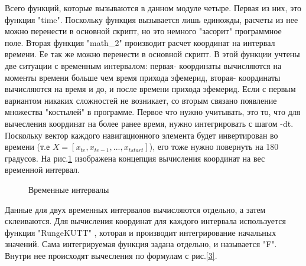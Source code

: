 \documentclass[]{article}
\begin{document}
	Всего функций, которые вызываются в данном модуле четыре.
	Первая из них, это функция "time". Поскольку функция вызывается лишь единожды, расчеты из нее можно перенести в основной скрипт, но это немного "засорит" программное поле.
	Вторая функция "math\_2" производит расчет координат на интервал времени. Ее так же можно перенести в основной скрипт. В этой функции учтены две ситуации с временным интервалом:
	первая- координаты вычисляются на моменты времени больше чем время прихода эфемерид, вторая- координаты вычисляются на время и до, и после времени прихода эфемерид. Если с первым вариантом никаких сложностей не возникает, со вторым связано появление множества "костылей" в программе. Первое что нужно учитывать, это то, что для вычесления координат на более ранее время, нужно интегрировать с шагом -dt. Поскольку вектор каждого навигационного элемента будет инвертирован во времени (т.е $ X=[x_{te}, x_{te-1},...,x_{tstart}]$), его тоже нужно повернуть на 180 градусов. 
	На рис.\ref{5} изображена концепция вычисления координат на вес временной интервал. 
	
	\begin{figure}[h!]
		
		\caption{Временные интервалы }
		\label{5}
	\end{figure}
	
	Данные для двух временных интервалов вычисляются отдельно, а затем склеиваются. Для вычисления координат для каждого интервала используется функция "RungeKUTT" , которая и производит интегрирование начальных значений. Сама интегрируемая функция задана отдельно, и называется "F". Внутри нее происходят вычесления по формулам с рис.\ref{3}. 
	
\end{document}
